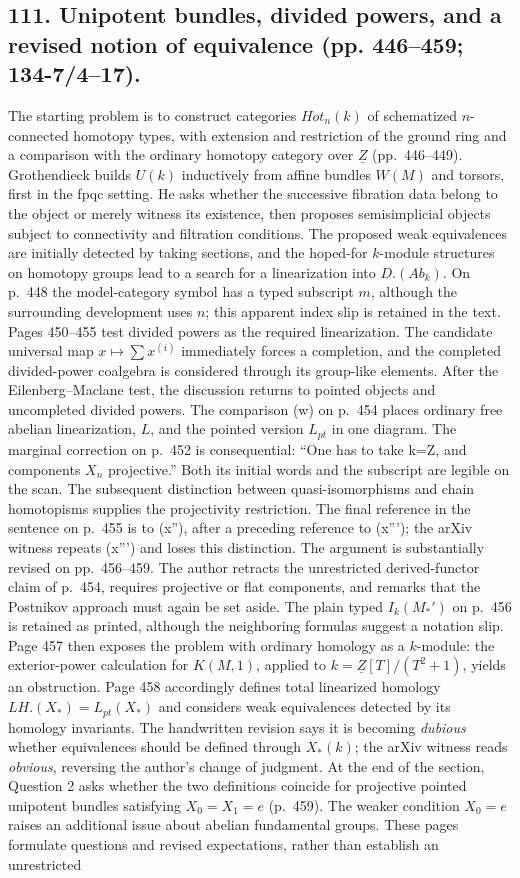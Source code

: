 \documentclass[10pt,oneside]{book}
\begin{document}
\subsection*{111. Unipotent bundles, divided powers, and a revised notion of equivalence (pp. 446--459; 134-7/4--17).}
The starting problem is to construct categories $Hot_n(k)$ of schematized $n$-connected homotopy types, with extension and restriction of the ground ring and a comparison with the ordinary homotopy category over $\underline Z$ (pp.~446--449). Grothendieck builds $U(k)$ inductively from affine bundles $W(M)$ and torsors, first in the fpqc setting. He asks whether the successive fibration data belong to the object or merely witness its existence, then proposes semisimplicial objects subject to connectivity and filtration conditions. The proposed weak equivalences are initially detected by taking sections, and the hoped-for $k$-module structures on homotopy groups lead to a search for a linearization into $D.(Ab_k)$. On p.~448 the model-category symbol has a typed subscript $m$, although the surrounding development uses $n$; this apparent index slip is retained in the text. Pages 450--455 test divided powers as the required linearization. The candidate universal map $x\mapsto\sum x^{(i)}$ immediately forces a completion, and the completed divided-power coalgebra is considered through its group-like elements. After the Eilenberg--Maclane test, the discussion returns to pointed objects and uncompleted divided powers. The comparison (w) on p.~454 places ordinary free abelian linearization, $L$, and the pointed version $L_{pt}$ in one diagram. The marginal correction on p.~452 is consequential: ``One has to take k=Z, and components $X_n$ projective.'' Both its initial words and the subscript are legible on the scan. The subsequent distinction between quasi-isomorphisms and chain homotopisms supplies the projectivity restriction. The final reference in the sentence on p.~455 is to (x''), after a preceding reference to (x'''); the arXiv witness repeats (x''') and loses this distinction. The argument is substantially revised on pp.~456--459. The author retracts the unrestricted derived-functor claim of p.~454, requires projective or flat components, and remarks that the Postnikov approach must again be set aside. The plain typed $I_k(M_*')$ on p.~456 is retained as printed, although the neighboring formulas suggest a notation slip. Page 457 then exposes the problem with ordinary homology as a $k$-module: the exterior-power calculation for $K(M,1)$, applied to $k=\underline Z[T]/(T^2+1)$, yields an obstruction. Page 458 accordingly defines total linearized homology $LH.(X_*)=L_{pt}(X_*)$ and considers weak equivalences detected by its homology invariants. The handwritten revision says it is becoming \emph{dubious} whether equivalences should be defined through $X_*(k)$; the arXiv witness reads \emph{obvious}, reversing the author's change of judgment. At the end of the section, Question 2 asks whether the two definitions coincide for projective pointed unipotent bundles satisfying $X_0=X_1=e$ (p.~459). The weaker condition $X_0=e$ raises an additional issue about abelian fundamental groups. These pages formulate questions and revised expectations, rather than establish an unrestricted 
\end{document}

